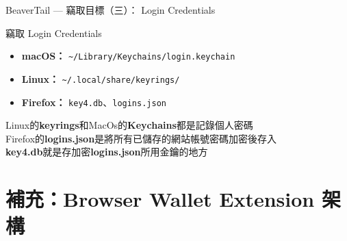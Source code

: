 \documentclass{beamer}
\begin{document}
\begin{frame}{BeaverTail — 竊取目標（三）： Login Credentials}
  \begin{block}{竊取 Login Credentials}
    \begin{itemize}
      \item \textbf{macOS：} \texttt{\~{}/Library/Keychains/login.keychain}
      \item \textbf{Linux：} \texttt{\~{}/.local/share/keyrings/}
      \item \textbf{Firefox：} \texttt{key4.db}、\texttt{logins.json}
    \end{itemize}
  \end{block}

  \vspace{0.2cm}
  Linux的\textbf{keyrings}和MacOs的\textbf{Keychains}都是記錄個人密碼\\
  Firefox的\textbf{logins.json}是將所有已儲存的網站帳號密碼加密後存入\\
  \textbf{key4.db}就是存加密\textbf{logins.json}所用金鑰的地方
\end{frame}

\section{補充：Browser Wallet Extension 架構}

\end{document}
